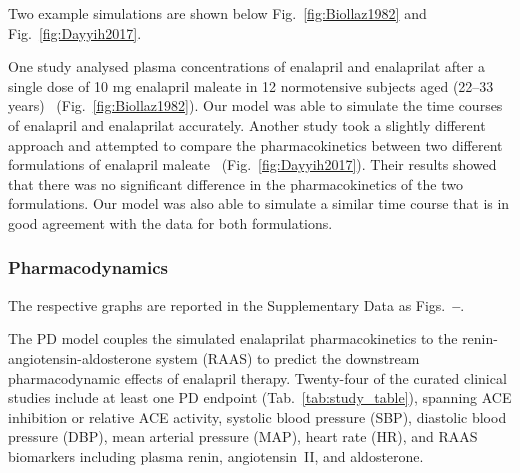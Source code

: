 \documentclass[pharmaceutics,article,submit,pdftex,moreauthors]{Definitions/mdpi}
\begin{document}
Two example simulations are shown below Fig.~\ref{fig:Biollaz1982} and Fig.~\ref{fig:Dayyih2017}.



One study analysed plasma concentrations of enalapril and enalaprilat after a single dose of 10 mg enalapril maleate in 12 normotensive subjects aged (22--33 years)~\cite{Biollaz1982} (Fig.~\ref{fig:Biollaz1982}). Our model was able to simulate the time courses of enalapril and enalaprilat accurately. Another study took a slightly different approach and attempted to compare the pharmacokinetics between two different formulations of enalapril maleate~\cite{Dayyih2017} (Fig.~\ref{fig:Dayyih2017}). Their results showed that there was no significant difference in the pharmacokinetics of the two formulations. Our model was also able to simulate a similar time course that is in good agreement with the data for both formulations.

\subsubsection{Pharmacodynamics}\label{sec:results_pd_simulations}

The respective graphs are reported in the Supplementary Data as Figs.~\textbf{--}.

The PD model couples the simulated enalaprilat pharmacokinetics to the renin-angiotensin-aldosterone system (RAAS) to predict the downstream pharmacodynamic effects of enalapril therapy. Twenty-four of the curated clinical studies include at least one PD endpoint (Tab.~\ref{tab:study_table}), spanning ACE inhibition or relative ACE activity, systolic blood pressure (SBP), diastolic blood pressure (DBP), mean arterial pressure (MAP), heart rate (HR), and RAAS biomarkers including plasma renin, angiotensin~II, and aldosterone.
\end{document}
